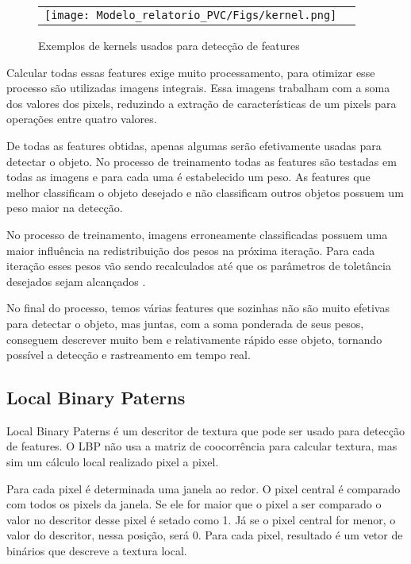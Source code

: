 \documentclass{bmvc2k}
\begin{document}
\begin{figure}[H]
    \centering
    \begin{tabular}{cc}
    \texttt{[image: Modelo\_relatorio\_PVC/Figs/kernel.png]}
    \end{tabular}
    \caption{Exemplos de kernels usados para detecção de features}
    \label{kernels}
\end{figure}

Calcular todas essas features exige muito processamento, para otimizar esse processo são utilizadas imagens integrais. Essa imagens trabalham com a soma dos valores dos pixels, reduzindo a extração de características de um pixels para operações entre quatro valores.

De todas as features obtidas, apenas algumas serão efetivamente usadas para detectar o objeto. No processo de treinamento todas as features são testadas em todas as imagens e para cada uma é estabelecido um peso. As features que melhor classificam o objeto desejado e não classificam outros objetos possuem um peso maior na detecção. 

No processo de treinamento, imagens erroneamente classificadas possuem uma maior influência na redistribuição dos pesos na próxima iteração. Para cada iteração esses pesos vão sendo recalculados até que os parâmetros de toletância desejados sejam alcançados \cite{haartrain}.

No final do processo, temos várias features que sozinhas não são muito efetivas para detectar o objeto, mas juntas, com a soma ponderada de seus pesos, conseguem descrever muito bem e relativamente rápido esse objeto, tornando possível a detecção e rastreamento em tempo real.

\subsection{Local Binary Paterns}

Local Binary Paterns é um descritor de textura que pode ser usado para detecção de features. O LBP não usa a matriz de coocorrência para calcular textura, mas sim um cálculo local realizado pixel a pixel\cite{lbp}.

Para cada pixel é determinada uma janela ao redor. O pixel central é comparado com todos os pixels da janela. Se ele for maior que o pixel a ser comparado o valor no descritor desse pixel é setado como 1. Já se o pixel central for menor, o valor do descritor, nessa posição, será 0. Para cada pixel, resultado é um vetor de binários que descreve a textura local.
\end{document}
